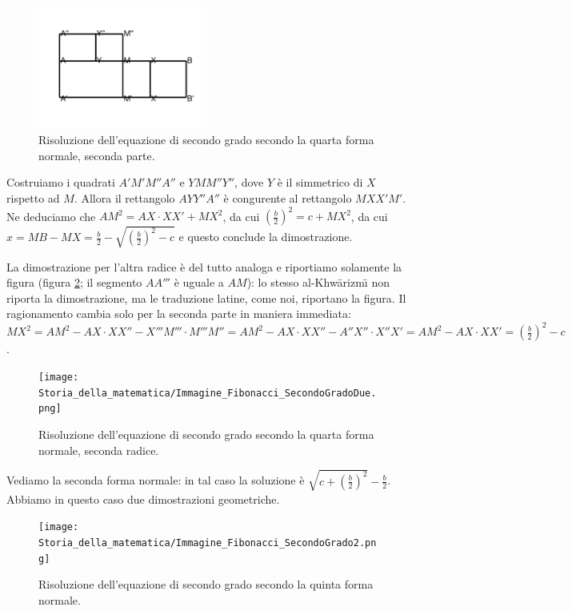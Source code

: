\begin{figure}
	\includegraphics[width=0.48\textwidth]{Storia_della_matematica/Immagine_Fibonacci_SecondoGradobis.png}
	\caption{Risoluzione dell'equazione di secondo grado secondo la quarta forma normale, seconda parte.}
	\label{Fibonacci_SecondoGradobis}
\end{figure}
\par Costruiamo i quadrati $A'M'M''A''$ e $YMM''Y''$, dove $Y$ \`e il simmetrico di $X$ rispetto ad $M$. Allora il rettangolo $AYY''A''$ \`e congurente al rettangolo $MXX'M'$. Ne deduciamo che $AM^2 = AX \cdot XX' + MX^2$, da cui $\left ( \frac{b}{2} \right )^2 = c + MX^2$, da cui $x = MB - MX = \frac{b}{2} - \sqrt{ \left ( \frac{b}{2} \right )^2 - c}$ e questo conclude la dimostrazione.
\par La dimostrazione per l'altra radice \`e del tutto analoga e riportiamo solamente la figura (figura \ref{Fibonacci_SecondoGradoDue}; il segmento $AA'''$ \`e uguale a $AM$): lo stesso al-Khw\=arizm\={\i} non riporta la dimostrazione, ma le traduzione latine, come noi, riportano la figura. Il ragionamento cambia solo per la seconda parte in maniera immediata: $MX^2 = AM^2 - AX \cdot XX'' - X'''M''' \cdot M'''M'' = AM^2 - AX \cdot XX'' - A''X'' \cdot X''X' = AM^2 - AX \cdot XX' = \left ( \frac{b}{2} \right )^2 - c$.
\begin{figure}
	\texttt{[image: Storia\_della\_matematica/Immagine\_Fibonacci\_SecondoGradoDue.png]}
	\caption{Risoluzione dell'equazione di secondo grado secondo la quarta forma normale, seconda radice.}
	\label{Fibonacci_SecondoGradoDue}
\end{figure}
\par Vediamo la seconda forma normale: in tal caso la soluzione \`e $\sqrt{c + \left ( \frac{b}{2} \right )^2} - \frac{b}{2}$. Abbiamo in questo caso due dimostrazioni geometriche.
\begin{figure}
	\texttt{[image: Storia\_della\_matematica/Immagine\_Fibonacci\_SecondoGrado2.png]}
	\caption{Risoluzione dell'equazione di secondo grado secondo la quinta forma normale.}
	\label{Fibonacci_SecondoGrado2}
\end{figure}
